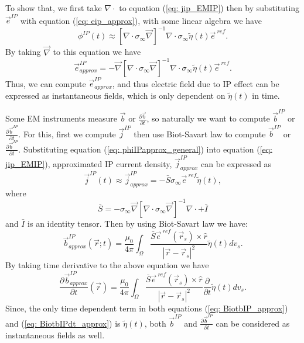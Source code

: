\documentclass[a4paper, 11pt]{article}
\renewcommand{\div}{\nabla\cdot}
\newcommand{\grad}{\vec \nabla}
\newcommand{\siginf}{\sigma_\infty}
\renewcommand {\j}  { {\vec j} }
\renewcommand {\b}  { {\vec b} }
\newcommand {\e}  { {\vec e} }
\newcommand{\peta}{\tilde{\eta}}
\begin{document}
To show that, we first take $\div$ to equation (\ref{eq: jip_EMIP}) then by substituting  $\e^{IP}$ with equation (\ref{eq: eip_approx}), with some linear algebra we have
\begin{equation}
  \phi^{IP}(t) \approx [\div \siginf\grad]^{-1}\div\siginf\peta(t)\e^{\ ref}.
  \label{eq: phiIPapprox_general}
\end{equation}
By taking $\grad$ to this equation we have
\begin{equation}
    \e^{IP}_{approx} = -\grad[\div \siginf\grad]^{-1}\div\siginf\peta(t)\e^{\ ref}.
    \label{eq: eip_approx_full}
\end{equation}
Thus, we can compute $\e^{IP}_{approx}$, and thus electric field due to IP effect can be expressed as instantaneous fields, which is only dependent on $\peta(t)$ in time.

Some EM instruments measure $\b$ or $\frac{\partial \b}{\partial t}$, so naturally we want to compute $\b^{IP}$ or $\frac{\partial \b^{IP}}{\partial t}$. For this, first we compute $\j^{IP}$ then use Biot-Savart law to compute $\b^{IP}$ or $\frac{\partial \b^{IP}}{\partial t}$. Substituting equation (\ref{eq: phiIPapprox_general}) into equation (\ref{eq: jip_EMIP}), approximated IP current density, $\j^{IP}_{approx}$ can be expressed as
\begin{equation}
  \j^{IP}(t) \approx \j^{IP}_{approx} = -\bar{S}\siginf\e^{\ ref}\peta(t),
  \label{eq: jip_approx}
\end{equation}
where
\begin{equation}
  \bar{S} = -\siginf\grad[\div \siginf\grad]^{-1}\div+\bar{I}
\end{equation}
and $\bar{I}$ is an identity tensor. Then by using Biot-Savart law we have:
\begin{equation}
  \b^{IP}_{approx}(\vec{r}; t) = \frac{\mu_0}{4\pi}\int_{\Omega}  \frac{\bar{S}\e^{\ ref}(\vec{r}_s)\times\hat{r}}{|\vec{r}-\vec{r}_s|^2}\peta(t)dv_s.
  \label{eq: BiotbIP_approx}
\end{equation}
By taking time derivative to the above equation we have
\begin{equation}
  \frac{\partial\b^{IP}_{approx}}{\partial t}(\vec{r}) = \frac{\mu_0}{4\pi} \int_{\Omega}  \frac{\bar{S}\e^{\ ref}(\vec{r}_s)\times\hat{r}}{|\vec{r}-\vec{r}_s|^2}\frac{\partial}{\partial t}\peta(t)dv_s.
  \label{eq: BiotbIPdt_approx}
\end{equation}
Since, the only time dependent term in both equations (\ref{eq: BiotbIP_approx}) and (\ref{eq: BiotbIPdt_approx}) is $\peta(t)$, both $\b^{IP}$ and $\frac{\partial \b^{IP}}{\partial t}$ can be considered as instantaneous fields as well.
\end{document}
